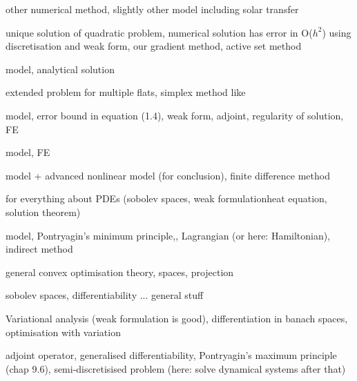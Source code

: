 \documentclass[landscape,parskip=half,7pt]{scrartcl}
\begin{document}
	\cite{HuangSeidelJiaPaschkeBraunig2021EnergyOptimalControlMultivalentBuildingEnergySystemusingMachineLearningconferencePaper} other numerical method, slightly other model including solar transfer

	\cite{Hinze2005VariationalDiscretizationConceptControlConstrainedOptimizationLinearQuadraticCasejournalArticle} unique solution of quadratic problem, numerical solution has error in O($h^2$) using discretisation and weak form, our gradient method, active set method

	\cite{HahnOzisik2012Heatconductionbook} model, analytical solution

	\cite{GustafssonRonnqvist2008OptimalheatinglargeblockflatsjournalArticle} extended problem for multiple flats, simplex method like

	\cite{GongHinzeZhou2014finiteelementmethodDirichletboundarycontrolproblemsgovernedparabolicPDEspreprint} model, error bound in equation (1.4), weak form, adjoint, regularity of solution, FE

	\cite{GockenbachSchmidtke2009NewtonslawheatingheatequationjournalArticle} model, FE

	\cite{FilipovHristovAvdzhievaFarago2023CoupledPDEODEModelNonlinearTransientHeatTransferConvectionHeatingBoundaryNumericalSolutionImplicitTimeDiscretizationSequentialDecouplingjournalArticle} model + advanced nonlinear model (for conclusion), finite difference method

	\cite{Evans2010Partialdifferentialequationsbook} for everything about PDEs (sobolev spaces, weak formulationheat equation, solution theorem)

	\cite{BiralBertolazziBosetti2016NotesNumericalMethodsSolvingOptimalControlProblemsjournalArticle} model, Pontryagin's minimum principle,, Lagrangian (or here: Hamiltonian), indirect method

	\cite{BauschkeCombettes2017ConvexAnalysisMonotoneOperatorTheoryHilbertSpacesbook} general convex optimisation theory, spaces, projection

	\cite{Alt2016LinearFunctionalAnalysisbook} sobolev spaces, differentiability ... general stuff

	\cite{Mordukhovich2006VariationalAnalysisGeneralizedDifferentiationbook} Variational analysis (weak formulation is good), differentiation in banach spaces, optimisation with variation

	\cite{Luenberger1969OptimizationVectorSpaceMethodsbook} adjoint operator, generalised differentiability, Pontryagin's maximum principle (chap 9.6), semi-discretisised problem (here: solve dynamical systems after that)
\end{document}
